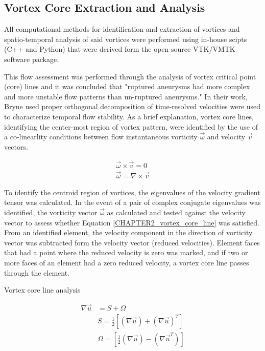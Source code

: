 \subsection{Vortex Core Extraction and Analysis}\label{CHAPTER2_SECTION1_SUBSECTION4}
All computational methods for identification and extraction of vortices and spatio-temporal analysis of said vortices were performed using in-house scipts (C++ and Python) that were derived form the open-source VTK/VMTK software package.


 


This flow assessment was performed through the analysis of vortex critical point (core) lines and it was concluded that "ruptured aneurysms had more complex and more unstable flow patterns than un-ruptured aneurysms." In their work, Bryne used proper orthogonal decomposition \cite{} of time-resolved velocities were used to characterize temporal flow stability. As a brief explanation, vortex core lines, identifying the center-most region of vortex pattern, were identified by the use of a co-linearlity conditions between flow instantaneous vorticity $\vec{\omega}$ and velocity $\vec{v}$ vectors.

\begin{equation}
\begin{aligned}
\vec{\omega} \times \vec{v} = 0 \\
\vec{\omega} = \nabla \times \vec{v}
\end{aligned}
\label{CHAPTER2_vortex_core_line}
\end{equation}

To identify the centroid region of vortices, the eigenvalues of the velocity gradient tensor was calculated. In the event of a pair of complex conjugate eigenvalues was identified, the vorticity vector $\vec{\omega}$ as calculated and tested against the velocity vector to assess whether Equation \ref{CHAPTER2_vortex_core_line} was satisfied. From an identified element, the velocity component in the direction of vorticity vector was subtracted form the velocity vector (reduced velocities). Element faces that had a point where the reduced velocity is zero was marked, and if two or more faces of an element had a zero reduced velocity, a vortex core line passes through the element. 

Vortex core line analysis 



\begin{equation}
\begin{aligned}
\nabla \vec{u} & = S + \Omega \\
  			   & S = \frac{1}{2}\left[(\nabla \vec{u}) + (\nabla \vec{u})^T\right] \\
  			   & \Omega = \left[\frac{1}{2}(\nabla \vec{u}) - (\nabla \vec{u}^T)\right]
\end{aligned}
 \label{CHAPTER2_velocity_gradient_tensor}
\end{equation}

